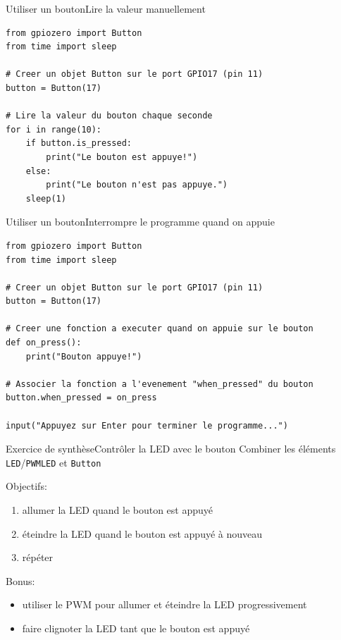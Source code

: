 \documentclass[
aspectratio=169 %
]{beamer}
\begin{document}
\begin{frame}[fragile]{Utiliser un bouton}{Lire la valeur manuellement}
    \begin{lstlisting}
from gpiozero import Button
from time import sleep

# Creer un objet Button sur le port GPIO17 (pin 11)
button = Button(17)

# Lire la valeur du bouton chaque seconde
for i in range(10):
    if button.is_pressed:
        print("Le bouton est appuye!")
    else:
        print("Le bouton n'est pas appuye.")
    sleep(1)
\end{lstlisting}
\end{frame}

\begin{frame}[fragile]{Utiliser un bouton}{Interrompre le programme quand on
        appuie}
    \begin{lstlisting}
from gpiozero import Button
from time import sleep

# Creer un objet Button sur le port GPIO17 (pin 11)
button = Button(17)

# Creer une fonction a executer quand on appuie sur le bouton
def on_press():
    print("Bouton appuye!")

# Associer la fonction a l'evenement "when_pressed" du bouton
button.when_pressed = on_press

input("Appuyez sur Enter pour terminer le programme...")
\end{lstlisting}
\end{frame}

\begin{frame}{Exercice de synthèse}{Contrôler la LED avec le bouton}
    Combiner les éléments \texttt{LED}/\texttt{PWMLED} et \texttt{Button}

    \bigskip
    Objectifs:
    \begin{enumerate}
        \item allumer la LED quand le bouton est appuyé
        \item éteindre la LED quand le bouton est appuyé à nouveau
        \item répéter
    \end{enumerate}

    \bigskip
    Bonus:
    \begin{itemize}
        \item utiliser le PWM pour allumer et éteindre la LED progressivement
        \item faire clignoter la LED tant que le bouton est appuyé
    \end{itemize}
\end{frame}
\end{document}
